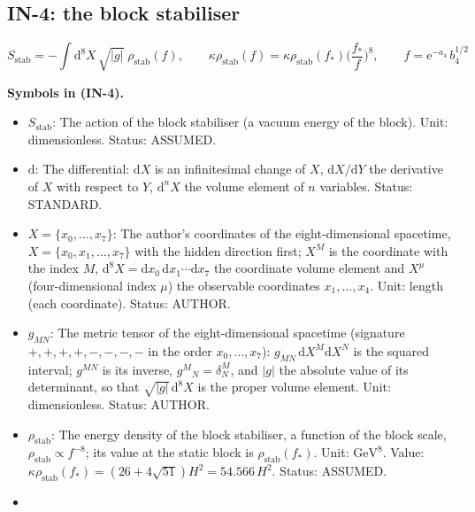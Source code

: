 \documentclass[
  10pt,
]{article}
\providecommand{\tightlist}{%
  \setlength{\itemsep}{0pt}\setlength{\parskip}{0pt}}
\begin{document}
\hypertarget{in-4-the-block-stabiliser}{%
\subsection{IN-4: the block
stabiliser}\label{in-4-the-block-stabiliser}}

\[
S_{\mathrm{stab}} = -\int\mathrm{d}^8X\,\sqrt{\lvert g\rvert}\;\rho_{\mathrm{stab}}(f),\qquad
\kappa\rho_{\mathrm{stab}}(f) = \kappa\rho_{\mathrm{stab}}(f_*)\Big(\frac{f_*}{f}\Big)^{8},\qquad
f = \mathrm{e}^{-a_4}\,b_4^{1/2} \tag{IN-4}
\]

\textbf{Symbols in (IN-4).}

\begin{itemize}
\tightlist
\item
  \(S_{\mathrm{stab}}\): The action of the block stabiliser (a vacuum
  energy of the block). Unit: dimensionless. Status: ASSUMED.
\item
  \(\mathrm{d}\): The differential: \(\mathrm{d}X\) is an infinitesimal
  change of \(X\), \(\mathrm{d}X/\mathrm{d}Y\) the derivative of \(X\)
  with respect to \(Y\), \(\mathrm{d}^nX\) the volume element of \(n\)
  variables. Status: STANDARD.
\item
  \(X = \{x_0, \dots, x_7\}\): The author's coordinates of the
  eight-dimensional spacetime, \(X = \{x_0, x_1, \dots, x_7\}\) with the
  hidden direction first; \(X^M\) is the coordinate with the index
  \(M\),
  \(\mathrm{d}^8X = \mathrm{d}x_0\,\mathrm{d}x_1\cdots\mathrm{d}x_7\)
  the coordinate volume element and \(X^\mu\) (four-dimensional index
  \(\mu\)) the observable coordinates \(x_1, \dots, x_4\). Unit: length
  (each coordinate). Status: AUTHOR.
\item
  \(g_{MN}\): The metric tensor of the eight-dimensional spacetime
  (signature \(+,+,+,+,-,-,-,-\) in the order \(x_0, \dots, x_7\)):
  \(g_{MN}\,\mathrm{d}X^M\mathrm{d}X^N\) is the squared interval;
  \(g^{MN}\) is its inverse, \(g^M{}_N = \delta^M_N\), and
  \(\lvert g\rvert\) the absolute value of its determinant, so that
  \(\sqrt{\lvert g\rvert}\,\mathrm{d}^8X\) is the proper volume element.
  Unit: dimensionless. Status: AUTHOR.
\item
  \(\rho_{\mathrm{stab}}\): The energy density of the block stabiliser,
  a function of the block scale,
  \(\rho_{\mathrm{stab}} \propto f^{-8}\); its value at the static block
  is \(\rho_{\mathrm{stab}}(f_*)\). Unit: \(\mathrm{GeV}^{8}\). Value:
  \(\kappa\rho_{\mathrm{stab}}(f_*) = (26 + 4\sqrt{51})H^2 = 54.566\,H^2\).
  Status: ASSUMED.
\item

\end{itemize}
\end{document}
